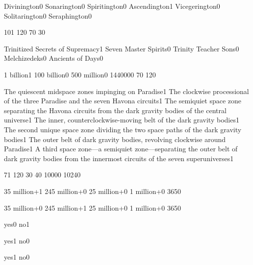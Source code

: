 {Divinington}{0}
{Sonarington}{0}
{Spiritington}{0}
{Ascendington}{1}
{Vicegerington}{0}
{Solitarington}{0}
{Seraphington}{0}
\qstop

{10}{1}
{12}{0}
{7}{0}
{3}{0}
\qstop

{Trinitized Secrets of Supremacy}{1}
{Seven Master Spirits}{0}
{Trinity Teacher Sons}{0}
{Melchizedeks}{0}
{Ancients of Days}{0}
\qstop


{1 billion}{1}
{100 billion}{0}
{500 million}{0}
{144000}{0}
{7}{0}
{12}{0}
\qstop

{The quiescent midspace zones impinging on Paradise}{1}
{The clockwise processional of the three Paradise and the seven Havona circuits}{1}
{The semiquiet space zone separating the Havona circuits from the dark gravity bodies of the central universe}{1}
{The inner, counterclockwise-moving belt of the dark gravity bodies}{1}
{The second unique space zone dividing the two space paths of the dark gravity bodies}{1}
{The outer belt of dark gravity bodies, revolving clockwise around Paradise}{1}
{A third space zone—a semiquiet zone—separating the outer belt of dark gravity bodies from the innermost circuits of the seven superuniverses}{1}
\qstop

{7}{1}
{12}{0}
{3}{0}
{4}{0}
{1000}{0}
{1024}{0}
\qstop

{35 million+}{1}
{245 million+}{0}
{25 million+}{0}
{1 million+}{0}
{365}{0}
\qstop

{35 million+}{0}
{245 million+}{1}
{25 million+}{0}
{1 million+}{0}
{365}{0}
\qstop

{yes}{0}
{no}{1}
\qstop

{yes}{1}
{no}{0}
\qstop

{yes}{1}
{no}{0}
\qstop


